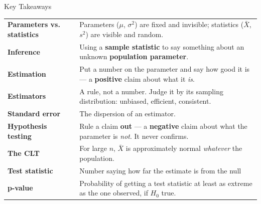\documentclass[9pt,english,aspectratio=169]{beamer}
\begin{document}
\begin{frame}{Key Takeaways}

  \begin{tabular}{@{} l p{9.4cm} @{}}
    \textbf{Parameters vs. statistics} & Parameters ($\mu$, $\sigma^2$) are fixed
      and invisible; statistics ($\bar{X}$, $s^2$) are visible and random.
      \\[0.4em]
    \textbf{Inference} & Using a \textbf{sample statistic} to say something
      about an unknown \textbf{population parameter}. \\[0.4em]
    \textbf{Estimation} & Put a number on the parameter and say how good it is
      --- a \textbf{positive} claim about what it \emph{is}. \\[0.4em]
    \textbf{Estimators} & A rule, not a number. Judge it by its sampling
      distribution: unbiased, efficient, consistent. \\[0.4em]
    \textbf{Standard error} & The dispersion of an estimator. \\[0.4em]
    \textbf{Hypothesis testing} & Rule a claim \textbf{out} --- a
      \textbf{negative} claim about what the parameter is \emph{not}. It never
      confirms. \\[0.4em]
    \textbf{The CLT} & For large $n$, $\bar{X}$ is approximately normal
      \emph{whatever} the population. \\[0.4em]
    \textbf{Test statistic} & Number saying how far the estimate is from the null \\[0.4em]
    \textbf{p-value} & Probability of getting a test statistic at least as extreme as the one observed, if $H_0$ true. \\[0.4em]
  \end{tabular}

\end{frame}


\end{document}
